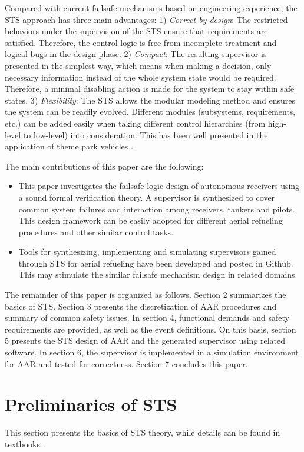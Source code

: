 Compared with current failsafe mechanisms based on engineering experience, the STS approach has three main advantages: 1) \textit{Correct by design}: The restricted behaviors under the supervision of the STS ensure that requirements are satisfied. Therefore, the control logic is free from incomplete treatment and logical bugs in the design phase. 2) \textit{Compact}: The resulting supervisor is presented in the simplest way, which means when making a decision, only necessary information instead of the whole system state would be required. Therefore, a minimal disabling action is made for the system to stay within safe states. 3) \textit{Flexibility}: The STS allows the modular modeling method and ensures the system can be readily evolved. Different modules (subsystems, requirements, etc.) can be added easily when taking different control hierarchies (from high-level to low-level) into consideration. This has been well presented in the application of theme park vehicles \cite{Forschelen2012Application}.

The main contributions of this paper are the following: 
\begin{itemize}
	\item This paper  investigates the failsafe logic design of autonomous receivers using a sound formal verification theory. A supervisor is synthesized to cover common system failures and interaction among receivers, tankers and pilots. This design framework can be easily adopted for different aerial refueling procedures and other similar control tasks.
	\item Tools for synthesizing, implementing and simulating supervisors gained through STS for aerial refueling have been developed and posted in Github. This may stimulate the similar failsafe mechanism design in related domains.
\end{itemize}

The remainder of this paper is organized as follows. Section 2 summarizes the basics of STS. Section 3 presents the discretization of AAR procedures and summary of common safety issues. In section 4, functional demands and safety requirements are provided, as well as the event definitions. On this basis, section 5 presents the STS design of AAR and the generated supervisor using related software. In section 6, the supervisor is implemented in a simulation environment for AAR and tested for correctness. Section 7 concludes this paper.

\section {Preliminaries of STS}
This section presents the basics of STS theory, while details can be found in textbooks \cite{ma2006nonblocking, cai2010supervisor, wonham2015supervisory}. 

